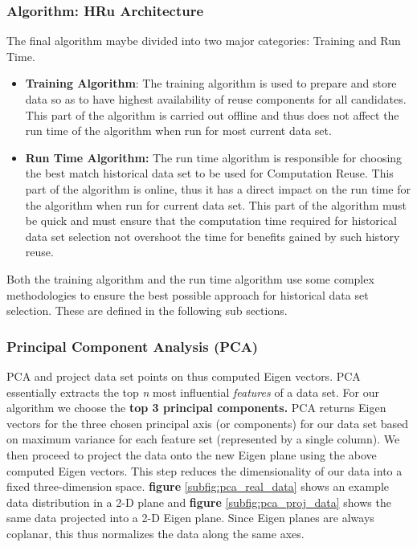 \documentclass{vldb}
\begin{document}
\subsubsection{Algorithm: HRu Architecture}
The final algorithm maybe divided into two major categories: Training and Run Time. 
\begin{itemize}
	\item \textbf{Training Algorithm}: The training algorithm is used to prepare and store data so as to have highest availability of reuse components for all candidates. This part of the algorithm is carried out offline and thus does not affect the run time of the algorithm when run for most current data set.
	\item \textbf{Run Time Algorithm:} The run time algorithm is responsible for choosing the best match historical data set to be used for Computation Reuse. This part of the algorithm is online, thus it has a direct impact on the run time for the algorithm when run for current data set. This part of the algorithm must be quick and must ensure that the computation time required for historical data set selection not overshoot the time for benefits gained by such history reuse.
\end{itemize}

Both the training algorithm and the run time algorithm use some complex methodologies to ensure the best possible approach for historical data set selection. These are defined in the following sub sections.

\subsubsection{Principal Component Analysis (PCA)}
\label{principal_comp_analysis}
	PCA\cite{pca}\cite{opencv_library} \cite{opencv_manual} and project data set points on thus computed Eigen vectors. PCA essentially extracts the top \textit{n} most influential \textit{features} of a data set. For our algorithm we choose the \textbf{top 3 principal components.} PCA returns Eigen vectors for the three chosen principal axis (or components) for our data set based on maximum variance for each feature set (represented by a single column). We then proceed to project the data onto the new Eigen plane using the above computed Eigen vectors. This step reduces the dimensionality of our data into a fixed three-dimension space.
\textbf{figure}  \ref{subfig:pca_real_data} shows an example data distribution in a 2-D plane and \textbf{figure} \ref{subfig:pca_proj_data} shows the same data projected into a 2-D Eigen plane. Since Eigen planes are always coplanar, this thus normalizes the data along the same axes. 
 
\end{document}
